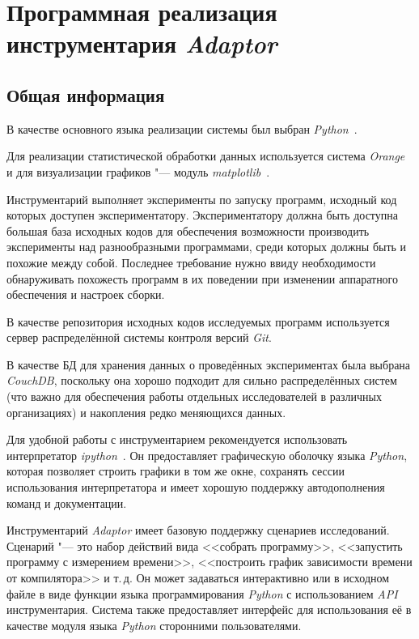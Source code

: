 \section{Программная реализация инструментария \textit{Adaptor}}
\subsection{Общая информация}
В качестве основного языка реализации системы был выбран \textit{Python}~\cite{python}.

Для реализации статистической обработки данных используется система \textit{Orange}~\cite{orange} и для визуализации графиков "--- модуль \textit{matplotlib}~\cite{matplotlib}.

Инструментарий выполняет эксперименты по запуску программ, исходный код которых доступен экспериментатору. Экспериментатору должна быть доступна большая база исходных кодов для обеспечения возможности производить эксперименты над разнообразными программами, среди которых должны быть и похожие между собой. Последнее требование нужно ввиду необходимости обнаруживать похожесть программ в их поведении при изменении аппаратного обеспечения и настроек сборки.

В качестве репозитория исходных кодов исследуемых программ используется сервер распределённой системы контроля версий \textit{Git}.

В качестве БД для хранения данных о проведённых экспериментах была выбрана \textit{CouchDB}, поскольку она хорошо подходит для сильно распределённых систем (что важно для обеспечения работы отдельных исследователей в различных организациях) и накопления редко меняющихся данных.

Для удобной работы с инструментарием рекомендуется использовать интерпретатор \textit{ipython}~\cite{ipython}. Он предоставляет графическую оболочку языка \textit{Python}, которая позволяет строить графики в том же окне, сохранять сессии использования интерпретатора и имеет хорошую поддержку автодополнения команд и документации.

Инструментарий \textit{Adaptor} имеет базовую поддержку сценариев исследований. Сценарий "--- это набор действий вида <<собрать программу>>, <<запустить программу с измерением времени>>, <<построить график зависимости времени от компилятора>> и т.\,д. Он может задаваться интерактивно или в исходном файле в виде функции языка программирования \textit{Python} с использованием \textit{API} инструментария. Система также предоставляет интерфейс для использования её в качестве модуля языка \textit{Python} сторонними пользователями.


